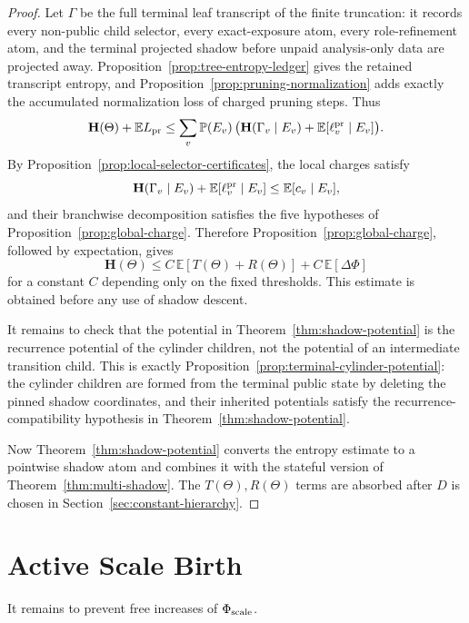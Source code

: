 \documentclass[11pt]{article}
\newcommand{\Prb}{\mathbb P}
\newcommand{\EE}{\mathbb E}
\newcommand{\bfH}{\mathbf H}
\begin{document}
\begin{proof}
Let $\Gamma$ be the full terminal leaf transcript of the finite truncation:
it records every non-public child selector, every exact-exposure atom, every
role-refinement atom, and the terminal projected shadow before unpaid
analysis-only data are projected away.  Proposition~\ref{prop:tree-entropy-ledger}
gives the retained transcript entropy, and
Proposition~\ref{prop:pruning-normalization} adds exactly the accumulated
normalization loss of charged pruning steps.  Thus
\[
  \bfH(\Theta)+\EE L_{\rm pr}
  \le
  \sum_v \Prb(E_v)\,
  \bigl(\bfH(\Gamma_v\mid E_v)+\EE[\ell_v^{\rm pr}\mid E_v]\bigr).
\]
By Proposition~\ref{prop:local-selector-certificates}, the local charges
satisfy
\[
  \bfH(\Gamma_v\mid E_v)+\EE[\ell_v^{\rm pr}\mid E_v]\le \EE[c_v\mid E_v],
\]
and their branchwise decomposition satisfies the five hypotheses of
Proposition~\ref{prop:global-charge}.  Therefore
Proposition~\ref{prop:global-charge}, followed by expectation, gives
\[
  \bfH(\Theta)
  \le
  C\,\EE[T(\Theta)+R(\Theta)]
  + C\,\EE[\Delta\Phi]
\]
for a constant $C$ depending only on the fixed thresholds.  This estimate is
obtained before any use of shadow descent.

It remains to check that the potential in Theorem~\ref{thm:shadow-potential}
is the recurrence potential of the cylinder children, not the potential of an
intermediate transition child.  This is exactly
Proposition~\ref{prop:terminal-cylinder-potential}: the cylinder children are
formed from the terminal public state by deleting the pinned shadow
coordinates, and their inherited potentials satisfy the
recurrence-compatibility hypothesis in Theorem~\ref{thm:shadow-potential}.

Now Theorem~\ref{thm:shadow-potential} converts the entropy estimate to a
pointwise shadow atom and combines it with the stateful version of
Theorem~\ref{thm:multi-shadow}.  The $T(\Theta),R(\Theta)$ terms are absorbed
after $D$ is chosen in Section~\ref{sec:constant-hierarchy}.
\end{proof}

\section{Active Scale Birth}

It remains to prevent free increases of $\Phi_{\rm scale}$.
\end{document}
